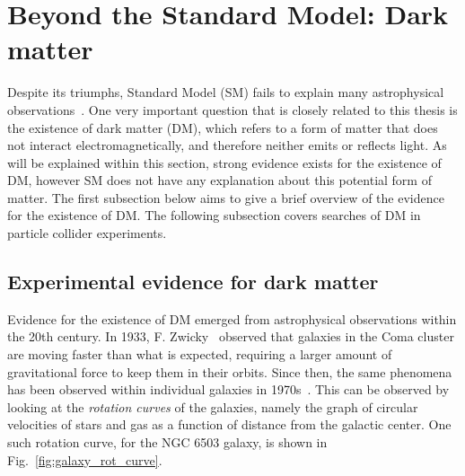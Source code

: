 \section{Beyond the Standard Model: Dark matter}

\graphicspath{{1_TheoreticalBackground/Figures/DM}}

Despite its triumphs, Standard Model (SM) fails to explain many astrophysical observations~\cite{Bertone:2004pz}.
One very important question that is closely related to this thesis is the existence of dark matter (DM), which
refers to a form of matter that does not interact electromagnetically, and therefore neither emits or reflects light.
As will be explained within this section, strong evidence exists for the existence of DM, however SM
does not have any explanation about this potential form of matter.
The first subsection below aims to give a brief overview of the evidence for the existence of DM.
The following subsection covers searches of DM in particle collider experiments.

\subsection{Experimental evidence for dark matter}
\label{subsec:dm_evidence}

Evidence for the existence of DM emerged from astrophysical observations within the 20th century. In 1933,
F. Zwicky~\cite{Zwicky:1933gu} observed that galaxies in the Coma cluster are moving faster than what
is expected, requiring a larger amount of gravitational force to keep them in their orbits. Since then, the
same phenomena has been observed within individual galaxies in 1970s~\cite{Bertone:2004pz}. This can be observed
by looking at the \textit{rotation curves} of the galaxies, namely the graph of circular velocities of stars and gas
as a function of distance from the galactic center. One such rotation curve, for the NGC 6503 galaxy, is shown in
Fig.~\ref{fig:galaxy_rot_curve}.

